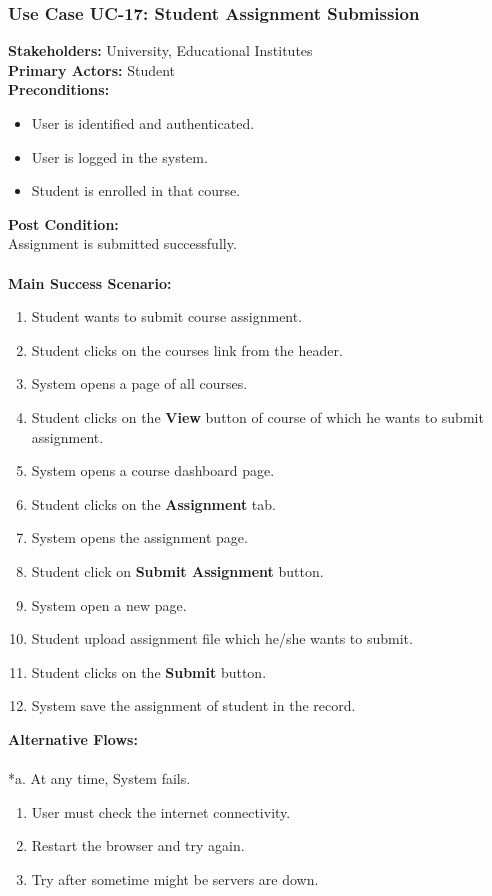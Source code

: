\documentclass[12pt]{article}
\begin{document}
\subsubsection{Use Case UC-17: Student Assignment Submission}
\textbf{Stakeholders: } University, Educational Institutes \\
\textbf{Primary Actors: }Student \\
\textbf{Preconditions:}
\begin{itemize}
\item User is identified and authenticated.
\item User is logged in the system.
\item Student is enrolled in that course.
\end{itemize}
\textbf{Post Condition: }\\
Assignment is submitted successfully.\\
\\
\textbf{Main Success Scenario:}
\begin{enumerate}
\item Student wants to submit course assignment.
\item Student clicks on the courses link from the header.
\item System opens a page of all courses.
\item Student clicks on the \textbf{View} button of course of which he wants to submit assignment.
\item System opens a course dashboard page.
\item Student clicks on the \textbf{Assignment} tab.
\item System opens the assignment page.
\item Student click on \textbf{Submit Assignment} button.
\item System open a new page.
\item Student upload assignment file which he/she wants to submit.
\item Student clicks on the \textbf{Submit} button.
\item System save the assignment of student in the record.
\end{enumerate}
\textbf{Alternative Flows:}\\
\\
*a. At any time, System fails.
\begin{enumerate}
\item User must check the internet connectivity.
\item Restart the browser and try again.
\item Try after sometime might be servers are down.
\end{enumerate}
\end{document}
